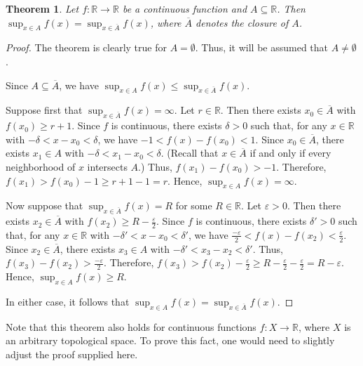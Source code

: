 \documentclass[12pt]{article}
\newtheorem{thm*}{Theorem}
\begin{document}
\begin{thm*}
Let $f \colon \mathbb{R} \to \mathbb{R}$ be a continuous function and $A \subseteq \mathbb{R}$.  Then $\displaystyle \sup_{x \in A} f(x)=\sup_{x \in \overline{A}} f(x)$, where $\overline{A}$ denotes the closure of $A$.
\end{thm*}

\begin{proof}
The theorem is clearly true for $A=\emptyset$.  Thus, it will be assumed that $A \neq \emptyset$.

Since $A \subseteq \overline{A}$, we have $\displaystyle \sup_{x \in A} f(x) \le \sup_{x \in \overline{A}} f(x)$.

Suppose first that $\displaystyle \sup_{x \in \overline{A}} f(x)=\infty$.  Let $r \in \mathbb{R}$.  Then there exists $x_0 \in \overline{A}$ with $f(x_0) \ge r+1$.  Since $f$ is continuous, there exists $\delta >0$ such that, for any $x \in \mathbb{R}$ with $-\delta<x-x_0<\delta$, we have $-1<f(x)-f(x_0)<1$.  Since $x_0 \in \overline{A}$, there exists $x_1 \in A$ with $-\delta <x_1-x_0<\delta$.  (Recall that $x \in \overline{A}$ if and only if every neighborhood of $x$ intersects $A$.)  Thus, $f(x_1)-f(x_0)>-1$.  Therefore, $f(x_1)>f(x_0)-1 \ge r+1-1=r$.  Hence, $\displaystyle \sup_{x \in A} f(x)=\infty$.

Now suppose that $\displaystyle \sup_{x \in \overline{A}} f(x)=R$ for some $R \in \mathbb{R}$.  Let $\varepsilon >0$.  Then there exists $x_2 \in \overline{A}$ with $f(x_2) \ge R-\frac{\varepsilon}{2}$.  Since $f$ is continuous, there exists $\delta '>0$ such that, for any $x \in \mathbb{R}$ with $-\delta '<x-x_0<\delta '$, we have $\frac{-\varepsilon}{2}<f(x)-f(x_2)<\frac{\varepsilon}{2}$.  Since $x_2 \in \overline{A}$, there exists $x_3 \in A$ with $-\delta '<x_3-x_2<\delta '$.  Thus, $f(x_3)-f(x_2)>\frac{-\varepsilon}{2}$.  Therefore, $f(x_3)>f(x_2)-\frac{\varepsilon}{2} \ge R-\frac{\varepsilon}{2}-\frac{\varepsilon}{2}=R-\varepsilon$.  Hence, $\displaystyle \sup_{x \in A} f(x) \ge R$.

In either case, it follows that $\displaystyle \sup_{x \in A} f(x)=\sup_{x \in \overline{A}} f(x)$.
\end{proof}

Note that this theorem also holds for continuous functions $f \colon X \to \mathbb{R}$, where $X$ is an arbitrary topological space.  To prove this fact, one would need to slightly adjust the proof supplied here.
\end{document}

